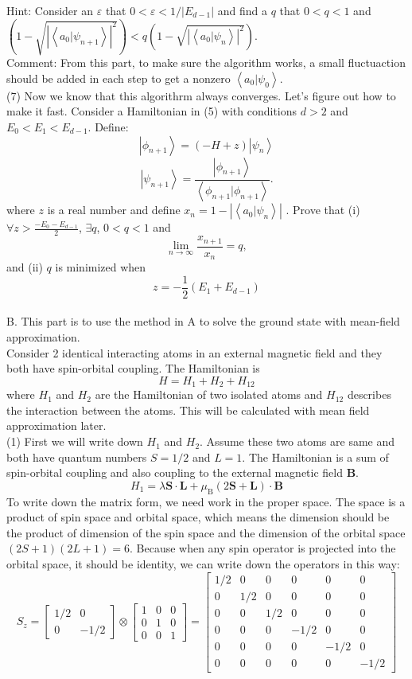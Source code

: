 \documentclass[letter]{article}
\begin{document}
\indent Hint: Consider an $\varepsilon$ that $0<\varepsilon<1/|E_{d-1}|$ and find a $q$ that $0<q<1$ and $\left(1-\sqrt{\left|\left<a_0|\psi_{n+1}\right>\right|^2}\right)<q\left(1-\sqrt{\left|\left<a_0|\psi_{n}\right>\right|^2}\right)$.\\
\indent Comment: From this part, to make sure the algorithm works, a small fluctuaction should be added in each step to get a nonzero $\left<a_0|\psi_0\right>$.\\
\indent (7) Now we know that this algorithrm always converges. Let's figure out how to make it fast. Consider a Hamiltonian in (5) with conditions $d>2$ and $E_0<E_1<E_{d-1}$. Define:$$\left|\phi_{n+1}\right>=\left(-H+z\right) \left|\psi_n\right>$$
$$\left|\psi_{n+1}\right>=\frac{\left|\phi_{n+1}\right>}{\left<\phi_{n+1}|\phi_{n+1}\right>}.$$
where $z$ is a real number and define $x_n=1-\left|\left<a_0|\psi_n\right>\right|$
. Prove that (i) $\forall z >\frac{-E_0-E_{d-1}}{2}$, $\exists q$, $0< q <1$ and $$
\lim _{n\rightarrow \infty} \frac{x_{n+1}}{x_n}=q,
$$
and (ii) $q$ is minimized when $$z=-\frac{1}{2}\left(E_1+E_{d-1}\right)$$\\
{\large{B}}. This part is to use the method in A to solve the ground state with mean-field approximation. \\
\indent Consider 2 identical interacting atoms in an external magnetic field and they both have spin-orbital coupling. The Hamiltonian is 
$$
H=H_1+H_2+H_{12}
$$
where $H_1$ and $H_2$ are the Hamiltonian of two isolated atoms and $H_{12}$ describes the interaction between the atoms. This will be calculated with mean field approximation later. \\
\indent (1) First we will write down $H_{1}$ and $H_2$. Assume these two atoms are same and both have quantum numbers $S=1/2$ and $L=1$. The Hamiltonian is a sum of spin-orbital coupling and also coupling to the external magnetic field $\bm{B}$.
$$H_1=\lambda \bm{S}\cdot\bm{L}+\mu_{\mathrm{B}}(2\bm{S}+\bm{L})\cdot\bm{B}
$$
To write down the matrix form, we need work in the proper space. The space is a product of spin space and orbital space, which means the dimension should be the product of dimension of the spin space and the dimension of the orbital space $(2S+1)(2L+1)=6$. Because when any spin operator is projected into the orbital space, it should be identity, we can write down the operators in this way:
$$S_z=\begin{bmatrix}
1/2 & 0\\
0 & -1/2
\end{bmatrix} \otimes \begin{bmatrix}
1 &0 &0\\
0 & 1 & 0 \\
0 &0 &1
\end{bmatrix}=\begin{bmatrix}
1/2 &0 &0 &0 &0 &0\\
0 &1/2 &0 &0 &0 &0\\
0 &0 &1/2 &0 &0 &0\\
0 &0 &0 &-1/2 &0 &0\\
0 &0 &0 &0 &-1/2 &0\\
0 &0 &0 &0 &0 &-1/2
\end{bmatrix}
$$
\end{document}
